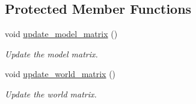 \subsection*{Protected Member Functions}
\begin{DoxyCompactItemize}
\item 
void \mbox{\hyperlink{classprz_1_1_transform_a9c1c93dfd49898aa0d1241036daef430}{update\+\_\+model\+\_\+matrix}} ()
\begin{DoxyCompactList}\small\item\em Update the model matrix. \end{DoxyCompactList}\item 
void \mbox{\hyperlink{classprz_1_1_transform_a0575ce053e514816a99c97a340f582be}{update\+\_\+world\+\_\+matrix}} ()
\begin{DoxyCompactList}\small\item\em Update the world matrix. \end{DoxyCompactList}\end{DoxyCompactItemize}
